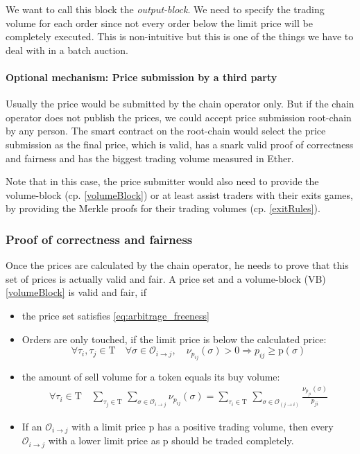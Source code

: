 \documentclass[11pt,parskip=full]{scrartcl}%
\newcommand{\Tau}{\mathrm{T}}
\def\pO{\mathcal{O}}
\def\ra{\rightarrow}
\begin{document}
We want to call this block the \emph{output-block}\label{volumeBlock}. 
We need to specify the trading volume for each order since not every order below the limit price will be completely executed. 
This is non-intuitive but this is one of the things we have to deal with in a batch auction. 

\paragraph{Optional mechanism: Price submission by a third party}
\label{publicPrices}
Usually the price would be submitted by the chain operator only. 
But if the chain operator does not publish the prices, we could accept price submission root-chain by any person. 
The smart contract on the root-chain would select the price submission as the final price, which is valid, has a snark valid proof of correctness and fairness and has the biggest trading volume measured in Ether. 

Note that in this case, the price submitter would also need to provide the volume-block (cp. \ref{volumeBlock}) or at least assist traders with their exits games, by providing the Merkle proofs for their trading volumes (cp. \ref{exitRules}). 

\subsubsection{Proof of correctness and fairness}
Once the prices are calculated by the chain operator, he needs to prove that this set of prices is actually valid and fair. A price set and a volume-block (VB) \ref{volumeBlock} is valid and fair, if

\begin{itemize}

\item the price set satisfies \ref{eq:arbitrage_freeness} 
\item Orders are only touched, if the limit price is below the calculated price:\newline
\begin{equation} \forall \tau_i ,\tau_j \in \Tau \quad \forall \sigma \in \pO_{i\ra j}, \quad \nu_{p_{ij}}(\sigma)>0 \Rightarrow p_{ij}\geq \text{p}(\sigma)
\end{equation}
\item the amount of sell volume for a token equals its buy volume: 
\begin{equation}
\begin{split}
\forall \tau_i \in \Tau \quad \sum_{\tau_j\in \Tau} \,
\sum_{ \sigma\in \pO_{i \rightarrow j}} \nu_{p_{ij}}(\sigma) = \sum_{\tau_i\in \Tau} \, \sum_{\sigma\in \pO_{(j\rightarrow i)}} \frac{\nu_{p_{ji}}(\sigma)}{p_{ji}}
\end{split}
\end{equation}
\item If an $\pO_{i\rightarrow j}$ with a limit price p has a positive trading volume, then every $\pO_{i\rightarrow j}$ with a lower limit price as p should be traded completely. 
\end{itemize}
\end{document}
